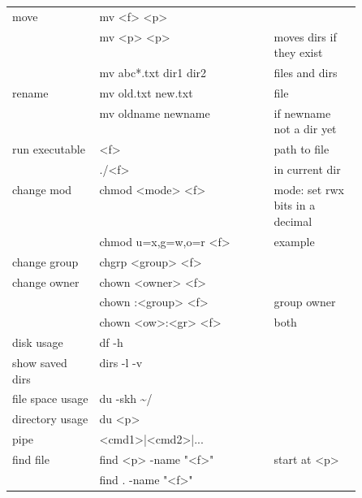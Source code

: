 {\begin{tabularx}{\linewidth}{@{} p{0.25\linewidth}>{\ttfamily}lp{0.25\linewidth} @{}}
        move                 & mv <f> <p>                 &                                  \\
                             & mv <p> <p>                 & moves dirs if they exist         \\
                             & mv abc*.txt dir1 dir2      & files and dirs                   \\
        rename               & mv old.txt new.txt         & file                             \\
                             & mv oldname newname         & if newname not a dir yet         \\
        run executable       & <f>                        & path to file                     \\
                             & ./<f>                      & in current dir                   \\
        change mod           & chmod <mode> <f>           & mode: set rwx bits in a decimal  \\
                             & chmod u=x,g=w,o=r <f>      & example                          \\
        change group         & chgrp <group> <f>          &                                  \\
        change owner         & chown <owner> <f>          &                                  \\
                             & chown :<group> <f>         & group owner                      \\
                             & chown <ow>:<gr> <f>        & both                             \\
        disk usage           & df -h                      &                                  \\
        show saved dirs      & dirs -l -v                 &                                  \\
        file space usage     & du -skh \textasciitilde{}/ &                                  \\
        directory usage      & du <p>                     &                                  \\
        pipe                 & <cmd1>|<cmd2>|...          &                                  \\
        find file            & find <p> -name "<f>"       & start at <p>                     \\
                             & find . -name "<f>"         &                                  \\

\end{tabularx}}
